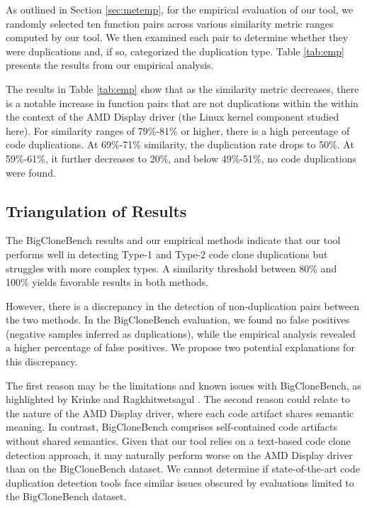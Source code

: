 As outlined in Section \ref{sec:metemp}, for the empirical evaluation of our tool, we randomly selected ten function pairs across various similarity metric ranges computed by our tool. We then examined each pair to determine whether they were duplications and, if so, categorized the duplication type. Table \ref{tab:emp} presents the results from our empirical analysis.



The results in Table \ref{tab:emp} show that as the similarity metric decreases, 
there is a notable increase in function pairs that are not duplications within 
the within the context of the AMD Display driver (the Linux kernel component studied here). 
For similarity ranges of 79\%-81\% or higher, there is a high 
percentage of code duplications. At 69\%-71\% similarity, the duplication rate 
drops to 50\%. At 59\%-61\%, it further decreases to 20\%, and below 49\%-51\%, 
no code duplications were found.

\subsection{Triangulation of Results}

The BigCloneBench results and our empirical methods indicate that our tool performs well in detecting Type-1 and Type-2 code clone duplications but struggles with more complex types. A similarity threshold between 80\% and 100\% yields favorable results in both methods.

However, there is a discrepancy in the detection of non-duplication pairs between the two methods. In the BigCloneBench evaluation, we found no false positives (negative samples inferred as duplications), while the empirical analysis revealed a higher percentage of false positives. We propose two potential explanations for this discrepancy.

The first reason may be the limitations and known issues with BigCloneBench, as highlighted by Krinke and Ragkhitwetsagul \citep{bigfail}. The second reason could relate to the nature of the AMD Display driver, where each code artifact shares semantic meaning. In contrast, BigCloneBench comprises self-contained code artifacts without shared semantics. Given that our tool relies on a text-based code clone detection approach, it may naturally perform worse on the AMD Display driver than on the BigCloneBench dataset. We cannot determine if state-of-the-art code duplication detection tools face similar issues obscured by evaluations limited to the BigCloneBench dataset.
